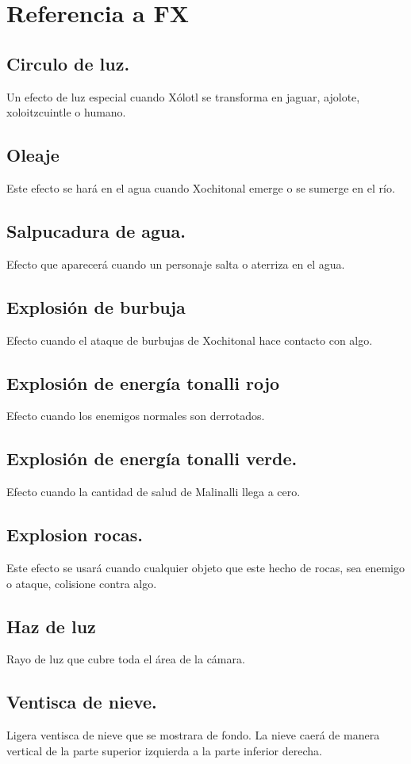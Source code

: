 \chapter{Referencia a FX}
\section{Circulo de luz.} \label{FX:CirLuz}
Un efecto de luz especial cuando Xólotl se transforma en jaguar, ajolote, xoloitzcuintle o humano.
\section{Oleaje}\label{FX:Oleaje}
Este efecto se hará en el agua cuando Xochitonal emerge o se sumerge en el río.
\section{Salpucadura de agua.} \label{FX:SalAgua}
Efecto que aparecerá cuando un personaje salta o aterriza en el agua.
\section{Explosión de burbuja}\label{FX:ExpAgua}
Efecto cuando el ataque de burbujas de Xochitonal hace contacto con algo.
\section{Explosión de energía tonalli rojo} \label{FX:ExpTonR}
Efecto cuando los enemigos normales son derrotados.
\section{Explosión de energía tonalli verde.} \label{FX:ExpTonV}
 Efecto cuando la cantidad de salud de Malinalli llega a cero.
\section{Explosion rocas.} \label{FX:ExpRoc}
Este efecto se usará cuando cualquier objeto que este hecho de rocas, sea enemigo o ataque, colisione contra algo.
\section{Haz de luz} \label{FX:HazLuz}
Rayo de luz que cubre toda el área de la cámara. 
\section{Ventisca de nieve.} \label{FX:VenNieve}
Ligera ventisca de nieve que se mostrara de fondo. La nieve caerá de manera vertical de la parte superior izquierda a la parte inferior derecha.